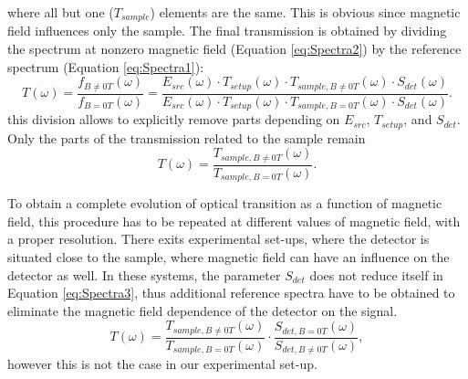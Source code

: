 \documentclass[titlepage,a4paper]{book}
\begin{document}
where all but one ($T_{sample}$) elements are the same. This is obvious since magnetic field influences only the sample. The final transmission is obtained by dividing the spectrum at nonzero magnetic field (Equation \ref{eq:Spectra2}) by the reference spectrum (Equation \ref{eq:Spectra1}):
\begin{equation}
\label{eq:Spectra3}
T(\omega) = \frac{f_{B\neq 0T}(\omega)}{f_{B=0T}(\omega)} = \frac{E_{src}(\omega)\cdot T_{setup}(\omega)\cdot T_{sample,B\neq 0T}(\omega)\cdot S_{det}(\omega)}{E_{src}(\omega)\cdot T_{setup}(\omega)\cdot T_{sample,B=0T}(\omega)\cdot S_{det}(\omega)}.
\end{equation}
this division allows to explicitly remove parts depending on $E_{src}$, $T_{setup}$, and $S_{det}$. Only the parts of the transmission related to the sample remain
\begin{equation}
\label{eq:Spectra4}
T(\omega) = \frac{T_{sample,B\neq 0T}(\omega)}{ T_{sample,B=0T}(\omega)}.
\end{equation}

To obtain a complete evolution of optical transition as a function of magnetic field, this procedure has to be repeated at different values of magnetic field, with a proper resolution. There exits experimental set-ups, where the detector is situated close to the sample, where magnetic field can have an influence on the detector as well. In these systems, the parameter $S_{det}$ does not reduce itself in Equation \ref{eq:Spectra3}, thus additional reference spectra have to be obtained to eliminate the magnetic field dependence of the detector on the signal.
\begin{equation}
\label{eq:Spectra5}
T(\omega) = \frac{T_{sample,B\neq 0T}(\omega)}{ T_{sample,B=0T}(\omega)}\cdot \frac{S_{det,B = 0T}(\omega)}{ S_{det,B\neq 0T}(\omega)},
\end{equation}
however this is not the case in our experimental set-up.
\end{document}
